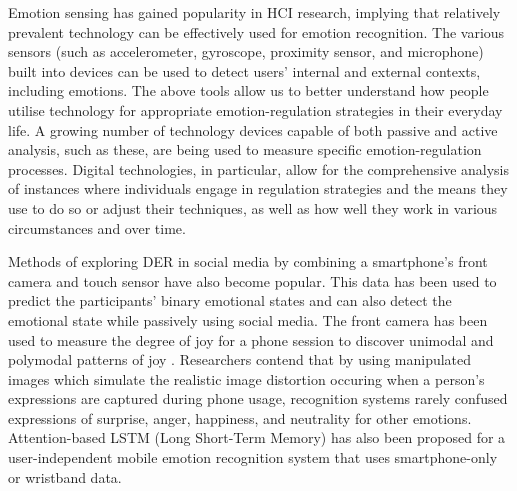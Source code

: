\documentclass[lettersize,journal]{IEEEtran}
\begin{document}

Emotion sensing has gained popularity in HCI research, implying that relatively prevalent technology can be effectively used for emotion recognition. The various sensors (such as accelerometer, gyroscope, proximity sensor, and microphone) built into devices can be used to detect users' internal and external contexts, including emotions. The above tools allow us to better understand how people utilise technology for appropriate emotion-regulation strategies in their everyday life. A growing number of technology devices capable of both passive and active analysis, such as these, are being used to measure specific emotion-regulation processes. Digital technologies, in particular, allow for the comprehensive analysis of instances where individuals engage in regulation strategies and the means they use to do so or adjust their techniques, as well as how well they work in various circumstances and over time. 




Methods of exploring DER in social media by combining a smartphone's front camera and touch sensor have also become popular. This data has been used to predict the participants' binary emotional states and can also detect the emotional state while passively using social media. The front camera has been used to measure the degree of joy for a phone session to discover unimodal and polymodal patterns of joy \cite{tag2022emotion}. Researchers contend that by using manipulated images which simulate the realistic image distortion occuring when a person's expressions are captured during phone usage, recognition systems rarely confused expressions of surprise, anger, happiness, and neutrality for other emotions. Attention-based LSTM (Long Short-Term Memory) has also been proposed for a user-independent mobile emotion recognition system that uses smartphone-only or wristband data.
\end{document}
